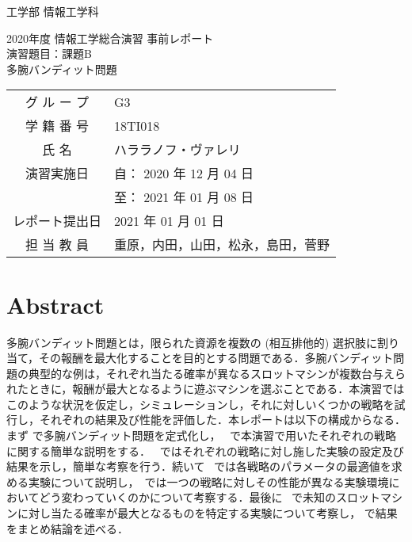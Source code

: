 \documentclass{jsarticle}
\begin{document}
\begin{titlepage}
	\begin{flushleft}
	{\Large 工学部 情報工学科}
	\end{flushleft}
	\vspace{100pt}
	\begin{center}
		{\huge 2020年度 情報工学総合演習 事前レポート}\\
		\vspace{40pt}
		{\huge 演習題目：課題B}\\ \vspace{10pt}
		{\huge 多腕バンディット問題}\\
		\vspace{100pt}
		\begin{table}[hp]
			\centering \LARGE
			\begin{tabular}{cl}
				グ ル ー プ    & G3 \\
				学 籍 番 号    & 18TI018 \\
				氏 名          & ハララノフ・ヴァレリ \\
				演習実施日     & 自： 2020 年 12 月 04 日\\
				               & 至： 2021 年 01 月 08 日 \\
				レポート提出日 & 2021 年 01 月 01 日 \\
				担 当 教 員 & 重原，内田，山田，松永，島田，菅野 \\
			\end{tabular}
		\end{table}
		\vfill
	\end{center}
\end{titlepage}
\newpage

\section*{Abstract}

多腕バンディット問題とは，限られた資源を複数の (相互排他的) 選択肢に割り当て，その報酬を最大化することを目的とする問題である．多腕バンディット問題の典型的な例は，それぞれ当たる確率が異なるスロットマシンが複数台与えられたときに，報酬が最大となるように遊ぶマシンを選ぶことである．本演習ではこのような状況を仮定し，シミュレーションし，それに対しいくつかの戦略を試行し，それぞれの結果及び性能を評価した．本レポートは以下の構成からなる．まず  で多腕バンディット問題を定式化し， ~で本演習で用いたそれぞれの戦略に関する簡単な説明をする． ~ではそれぞれの戦略に対し施した実験の設定及び結果を示し，簡単な考察を行う．続いて ~では各戦略のパラメータの最適値を求める実験について説明し，~では一つの戦略に対しその性能が異なる実験環境においてどう変わっていくのかについて考察する．最後に ~で未知のスロットマシンに対し当たる確率が最大となるものを特定する実験について考察し， で結果をまとめ結論を述べる．
\end{document}
